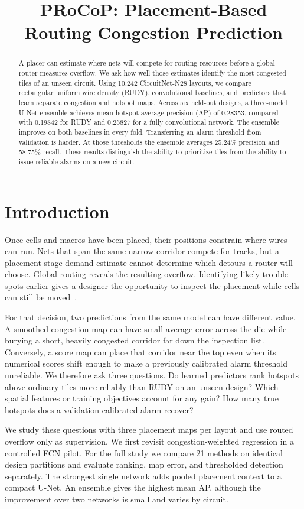 \IfFileExists{./ieeeconf.cls}{\documentclass[9pt]{ieeeconf}}{\documentclass[conference]{IEEEtran}\usepackage[T1]{fontenc}}
\title{PRoCoP: Placement-Based Routing Congestion Prediction}
\author{\IEEEauthorblockN{Ruichen Gao and Tianyi Yu}\IEEEauthorblockA{Georgia Institute of Technology}}
\begin{document}
\maketitle
\begin{abstract}
A placer can estimate where nets will compete for routing resources before a global router measures overflow. We ask how well those estimates identify the most congested tiles of an unseen circuit. Using 10,242 CircuitNet-N28 layouts, we compare rectangular uniform wire density (RUDY), convolutional baselines, and predictors that learn separate congestion and hotspot maps. Across six held-out designs, a three-model U-Net ensemble achieves mean hotspot average precision (AP) of 0.28353, compared with 0.19842 for RUDY and 0.25827 for a fully convolutional network. The ensemble improves on both baselines in every fold. Transferring an alarm threshold from validation is harder. At those thresholds the ensemble averages 25.24\% precision and 58.75\% recall. These results distinguish the ability to prioritize tiles from the ability to issue reliable alarms on a new circuit.
\end{abstract}

\section{Introduction}
Once cells and macros have been placed, their positions constrain where wires can run. Nets that span the same narrow corridor compete for tracks, but a placement-stage demand estimate cannot determine which detours a router will choose. Global routing reveals the resulting overflow. Identifying likely trouble spots earlier gives a designer the opportunity to inspect the placement while cells can still be moved~\cite{spindler2007rudy,liu2021global}.

For that decision, two predictions from the same model can have different value. A smoothed congestion map can have small average error across the die while burying a short, heavily congested corridor far down the inspection list. Conversely, a score map can place that corridor near the top even when its numerical scores shift enough to make a previously calibrated alarm threshold unreliable. We therefore ask three questions. Do learned predictors rank hotspots above ordinary tiles more reliably than RUDY on an unseen design? Which spatial features or training objectives account for any gain? How many true hotspots does a validation-calibrated alarm recover?

We study these questions with three placement maps per layout and use routed overflow only as supervision. We first revisit congestion-weighted regression in a controlled FCN pilot. For the full study we compare 21 methods on identical design partitions and evaluate ranking, map error, and thresholded detection separately. The strongest single network adds pooled placement context to a compact U-Net. An ensemble gives the highest mean AP, although the improvement over two networks is small and varies by circuit.
\end{document}
